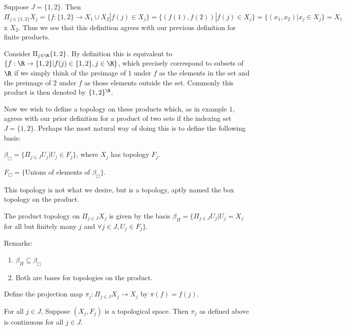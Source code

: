 \begin{example}
Suppose $J = \{1,2\}$.  Then $\Pi_{j\in \{1,2\}}X_j = \{f: \{1,2\} \rightarrow X_1\cup X_2|f(j) \in X_j\} = \{(f(1),f(2))|f(j) \in X_j\}=\{(x_1,x_2)|x_j \in X_j\} = X_1$ x $X_2.$  Thus we see that this definition agrees with our previous definition for finite products.
\end{example}

\begin{example}
Consider $\Pi_{j \in \R}\{1,2\}$.  By definition this is equivalent to $\{f: \R \rightarrow \{1,2\}| f(j) \in \{1,2\}, j \in \R\}$, which precisely correspond to subsets of $\R$ if we simply think of the preimage of $1$ under $f$ as the elements in the set and the preimage of $2$ under $f$ as those elements outside the set.  Commonly this product is then denoted by $\{1,2\}^{\R}$.
\end{example}

Now we wish to define a topology on these products which, as in example $1$, agrees with our prior definition for a product of two sets if the indexing set $J = \{1,2\}$.  Perhaps the most natural way of doing this is to define the following basis:
\begin{center}
$\beta_{\Box} = \{\Pi_{j \in J} U_j|U_j \in F_j\}$, where $X_j$ has topology $F_j$.

$F_{\Box} = \{$Unions of elements of $\beta_{\Box}\}.$
\end{center}
This topology is not what we desire, but is a topology, aptly named the box topology on the product.

\begin{example} The product topology on $\Pi_{j \in J}X_j$ is given by the basis $\beta_{\Pi} = \{\Pi_{j \in J}U_j|U_j = X_j$ for all but finitely many $j$ and $\forall j \in J, U_j \in F_j \}$.
\end{example}

Remarks: 
\begin{enumerate}
\item $\beta_{\Pi} \subseteq \beta_{\Box}$
\item Both are bases for topologies on the product.
\end{enumerate}

\begin{definition}
Define the projection map $\pi_j : \Pi_{j \in J}X_j \rightarrow X_j$ by $\pi(f) = f(j)$.
\end{definition}

\begin{lemma}
For all $j \in J$, Suppose $(X_j, F_j)$ is a topological space.  Then $\pi_j$ as defined above is continuous for all $j \in J$.
\end{lemma}

